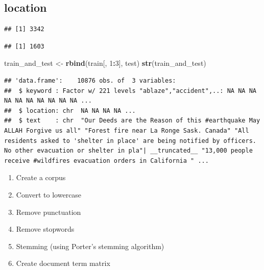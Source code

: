 \documentclass[
]{article}
\newenvironment{Shaded}{\begin{snugshade}}{\end{snugshade}}
\newcommand{\DecValTok}[1]{\textcolor[rgb]{0.00,0.00,0.81}{#1}}
\newcommand{\KeywordTok}[1]{\textcolor[rgb]{0.13,0.29,0.53}{\textbf{#1}}}
\newcommand{\NormalTok}[1]{#1}
\newcommand{\OperatorTok}[1]{\textcolor[rgb]{0.81,0.36,0.00}{\textbf{#1}}}
\newcommand{\StringTok}[1]{\textcolor[rgb]{0.31,0.60,0.02}{#1}}
\providecommand{\tightlist}{%
  \setlength{\itemsep}{0pt}\setlength{\parskip}{0pt}}
\begin{document}
\hypertarget{location}{%
\subsection{location}\label{location}}

\begin{Shaded}
\end{Shaded}

\begin{verbatim}
## [1] 3342
\end{verbatim}

\begin{Shaded}
\end{Shaded}

\begin{verbatim}
## [1] 1603
\end{verbatim}

\begin{Shaded}
\begin{Highlighting}[]
\NormalTok{train_and_test <-}\StringTok{ }\KeywordTok{rbind}\NormalTok{(train[, }\DecValTok{1}\OperatorTok{:}\DecValTok{3}\NormalTok{], test)}
\KeywordTok{str}\NormalTok{(train_and_test)}
\end{Highlighting}
\end{Shaded}

\begin{verbatim}
## 'data.frame':    10876 obs. of  3 variables:
##  $ keyword : Factor w/ 221 levels "ablaze","accident",..: NA NA NA NA NA NA NA NA NA NA ...
##  $ location: chr  NA NA NA NA ...
##  $ text    : chr  "Our Deeds are the Reason of this #earthquake May ALLAH Forgive us all" "Forest fire near La Ronge Sask. Canada" "All residents asked to 'shelter in place' are being notified by officers. No other evacuation or shelter in pla"| __truncated__ "13,000 people receive #wildfires evacuation orders in California " ...
\end{verbatim}

\begin{enumerate}
\def\labelenumi{\arabic{enumi}.}
\tightlist
\item
  Create a corpus
\item
  Convert to lowercase
\item
  Remove punctuation
\item
  Remove stopwords
\item
  Stemming (using Porter's stemming algorithm)
\item
  Create document term matrix
\end{enumerate}
\end{document}
